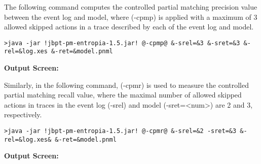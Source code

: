 The following command computes the controlled partial matching precision value between the event log and model, where (\textcolor{darkcandyapplered}{\footnotesize\ttfamily-cpmp}) is applied with a maximum of 3 allowed skipped actions in a trace described by each of the event log and model.
\begin{lstlisting}[style=CL]
>java -jar !jbpt-pm-entropia-1.5.jar! @-cpmp@ &-srel=&3 &-sret=&3 &-rel=&log.xes &-ret=&model.pnml
\end{lstlisting}
\textbf{Output Screen:}%


Similarly, in the following command, (\textcolor{darkcandyapplered}{\footnotesize\ttfamily-cpmr}) is used to measure the  controlled partial matching recall value, where the maximal number of allowed skipped actions in traces in the event log (\textcolor{ao}{\footnotesize\ttfamily-srel}) and model (\textcolor{ao}{\footnotesize\ttfamily-sret=<num>}) are 2 and 3, respectively.
\begin{lstlisting}[style=CL]
>java -jar !jbpt-pm-entropia-1.5.jar! @-cpmr@ &-srel=&2 -sret=&3 &-rel=&log.xes& &-ret=&model.pnml
\end{lstlisting}
\textbf{Output Screen:}%

